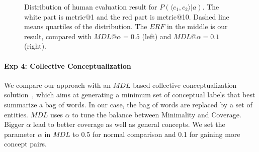 %
%
\begin{figure}[!b]
\centering
\footnotesize
{}
\vspace{-8mm}
\caption{\small Distribution of human evaluation result for $P(\langle c_1,c_2 \rangle|a)$. \footnotesize The white part is metric@1 and the red part is metric@10. Dashed line means quartiles of the distribution. The $ERF$ in the middle is our result, compared with $MDL@\alpha=0.5$ (left) and $MDL@\alpha=0.1$(right). }
\label{fig:eva_violin_pc1c2ga}
\vspace{-4mm}
\end{figure}

%
%

\vspace{-4mm}
\paragraph*{Exp 4: Collective Conceptualization}
We compare our approach with an $MDL$ based collective conceptualization solution~\cite{sunconceptual}, which aims at generating a minimum set of conceptual labels that best summarize a bag of words.
In our case, the bag of words are replaced by a set of entities.
$MDL$ uses $\alpha$ to tune the balance between \ac{Minimality} and \ac{Coverage}. 
Bigger $\alpha$ lead to better coverage as well as general concepts.
We set the parameter $\alpha$ in $MDL$ to 0.5 for normal comparison and 0.1 for gaining more concept pairs.

